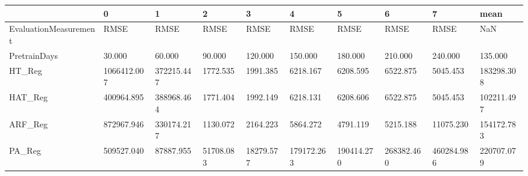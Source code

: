 \begin{tabular}{llllllllll}
\toprule
{} &           0 &          1 &         2 &         3 &          4 &          5 &          6 &          7 &       mean \\
\midrule
EvaluationMeasurement &        RMSE &       RMSE &      RMSE &      RMSE &       RMSE &       RMSE &       RMSE &       RMSE &        NaN \\
PretrainDays          &      30.000 &     60.000 &    90.000 &   120.000 &    150.000 &    180.000 &    210.000 &    240.000 &    135.000 \\
HT\_Reg                & 1066412.007 & 372215.447 &  1772.535 &  1991.385 &   6218.167 &   6208.595 &   6522.875 &   5045.453 & 183298.308 \\
HAT\_Reg               &  400964.895 & 388968.464 &  1771.404 &  1992.149 &   6218.131 &   6208.606 &   6522.875 &   5045.453 & 102211.497 \\
ARF\_Reg               &  872967.946 & 330174.217 &  1130.072 &  2164.223 &   5864.272 &   4791.119 &   5215.188 &  11075.230 & 154172.783 \\
PA\_Reg                &  509527.040 &  87887.955 & 51708.083 & 18279.577 & 179172.263 & 190414.270 & 268382.460 & 460284.986 & 220707.079 \\
\bottomrule
\end{tabular}
